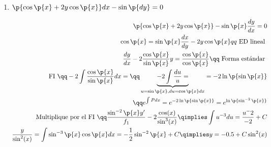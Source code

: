 \begin{enumerate}
    \item $\displaystyle \p{\cos\p{x} +2y\cos\p{ x } } dx -\sin\p{ dy } =0$ 
        \begin{center}
           \begin{align*}
               \p{\cos\p{ x } + 2y\cos\p{ x } } -\sin\p{ x } \frac{d y}{d x} =0 \\ 
               \cos\p{ x } = \sin\p{ x } \frac{d x}{d y} -2y\cos\p{ x } qq \text{ ED lineal } \\ 
               \frac{d y}{d x} -2\frac{\cos\p{x}}{\sin\p{ x } }y  = \frac{\cos\p{ x } }{\cos\p{ x } } \qq \text{ Forma estándar } \\ 
               \text{ FI } \qq -2\int \frac{\cos\p{ x } }{\sin\p{ x } }dx = \qq  \underbrace{-2\int \frac{du}{u} = }_{u=\sin\p{ x }, du=\cos\p{ x } dx} = -2\ln\p{ \sin\p{ x }  } \\ 
               \qq e^{\int P dx} = e^{-2\ln\p{ \sin\p{ x }  } } = e^{\ln\p{ \sin^{-2}\p{ x }  }  } \\ 
               \text{ Multiplique por el FI } \qq \frac{\sin^{-2}\p{ x }y' }{f_1} -2\frac{\cos(x)}{\sin^{3}(x)} \qimplies \int u^{-3}du = \frac{u^-2}{-2}+C \\ 
               \frac{y}{\sin^{2}(x)} = \int \sin^{-3}\p{ x } \cos\p{ x } dx  = -\frac{1}{2}\sin^{-2}\p{ x } +C \qimplies y = -0.5+C\sin^2(x) \\ 
           \end{align*}
        \end{center}
\end{enumerate}
